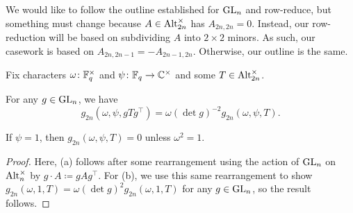 We would like to follow the outline established for $\mathrm{GL}_n$ and row-reduce, but something must change because $A\in\operatorname{Alt}_{2n}^\times$ has $A_{2n,2n}=0$. Instead, our row-reduction will be based on subdividing $A$ into $2\times2$ minors. As such, our casework is based on $A_{2n,2n-1}=-A_{2n-1,2n}$. Otherwise, our outline is the same.
\begin{lemma} \label{lem:gsum-alt-basic}
    Fix characters $\omega\colon\mathbb F_q^\times$ and $\psi\colon\mathbb F_q\to\mathbb C^\times$ and some $T\in\operatorname{Alt}_{2n}^\times$.
    \begin{listalph}
        \item For any $g\in\mathrm{GL}_n$, we have
        \[g_{2n}(\omega,\psi,gTg^\intercal)=\omega(\det g)^{-2}g_{2n}(\omega,\psi,T).\]
        \item If $\psi=1$, then $g_{2n}(\omega,\psi,T)=0$ unless $\omega^2=1$.
    \end{listalph}
\end{lemma}
\begin{proof}
    Here, (a) follows after some rearrangement using the action of $\mathrm{GL}_n$ on $\operatorname{Alt}_n^\times$ by $g\cdot A\coloneqq gAg^\intercal$. For (b), we use this same rearrangement to show $g_{2n}(\omega,1,T)=\omega(\det g)^2g_{2n}(\omega,1,T)$ for any $g\in\mathrm{GL}_n$, so the result follows.
\end{proof}
